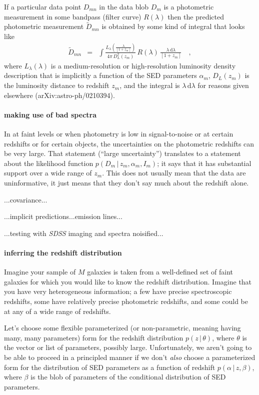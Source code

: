 \documentclass[12pt]{article}
\newcommand{\given}{\,|\,}
\newcommand{\dd}{\mathrm d}
\begin{document}
If a particular data point $D_{mn}$ in the data blob $D_m$ is a
photometric measurement in some bandpass (filter curve) $R(\lambda)$
then the predicted photometric measurement $\tilde{D}_{mn}$ is
obtained by some kind of integral that looks like
\begin{eqnarray}\displaystyle
\tilde{D}_{mn} &=& \int \frac{L_{\lambda}(\frac{\lambda}{[1+z_m]})}{4\pi\,D_L^2(z_m)}\,R(\lambda)\,\frac{\lambda\,\dd\lambda}{[1+z_m]}
\quad ,
\end{eqnarray}
where $L_{\lambda}(\lambda)$ is a medium-resolution or high-resolution
luminosity density description that is implicitly a function of the
SED parameters $\alpha_m$, $D_L(z_m)$ is the luminosity distance to
redshift $z_m$, and the integral is $\lambda\,\dd\lambda$ for reasons
given elsewhere (arXiv:astro-ph/0210394).

\paragraph{making use of bad spectra}
In at faint levels or when photometry is low in signal-to-noise or at
certain redshifts or for certain objects, the uncertainties on the
photometric redshifts can be very large.  That statement (``large
uncertainty'') translates to a statement about the likelihood function
$p(D_m \given z_m, \alpha_m, I_m)$; it says that it has substantial
support over a wide range of $z_m$.  This does not usually mean that
the data are uninformative, it just means that they don't say much
about the redshift alone.

...covariance...

...implicit predictions...emission lines...

...testing with \textsl{SDSS} imaging and spectra noisified...

\paragraph{inferring the redshift distribution}
Imagine your sample of $M$ galaxies is taken from a well-defined set
of faint galaxies for which you would like to know the redshift
distribution.  Imagine that you have very heterogeneous information; a
few have precise spectroscopic redshifts, some have relatively precise
photometric redshifts, and some could be at any of a wide range of
redshifts.

Let's choose some flexible parameterized (or non-parametric, meaning
having many, many parameters) form for the redshift distribution $p(z
\given \theta)$, where $\theta$ is the vector or list of parameters,
possibly large.  Unfortunately, we aren't going to be able to proceed
in a principled manner if we don't \emph{also} choose a parameterized
form for the distribution of SED parameters as a function of redshift
$p(\alpha \given z, \beta)$, where $\beta$ is the blob of parameters
of the conditional distribution of SED parameters.
\end{document}
